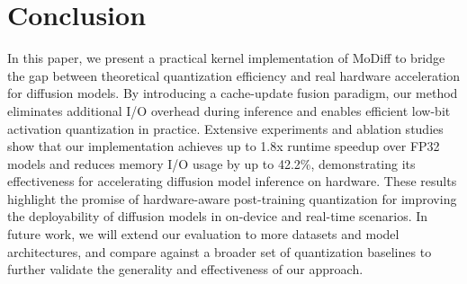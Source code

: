 \section{Conclusion}
In this paper, we present a practical kernel implementation of MoDiff to bridge the gap between theoretical quantization efficiency and real hardware acceleration for diffusion models. By introducing a cache-update fusion paradigm, our method eliminates additional I/O overhead during inference and enables efficient low-bit activation quantization in practice. Extensive experiments and ablation studies show that our implementation achieves up to 1.8x runtime speedup over FP32 models and reduces memory I/O usage by up to 42.2\%, demonstrating its effectiveness for accelerating diffusion model inference on hardware. These results highlight the promise of hardware-aware post-training quantization for improving the deployability of diffusion models in on-device and real-time scenarios. In future work, we will extend our evaluation to more datasets and model architectures, and compare against a broader set of quantization baselines to further validate the generality and effectiveness of our approach.

